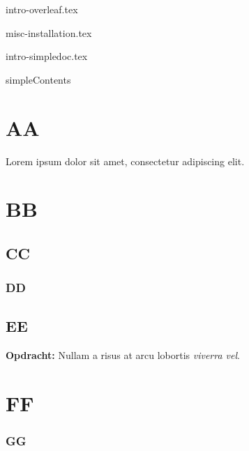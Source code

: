 \documentclass{cursuspresentatie}
\def\importslide#1#2{%
	{#2}
}
\begin{document}
    \importslide{intro}{intro-overleaf.tex}

	\importslide{misc}{misc-installation.tex}


    \importslide{intro}{intro-simpledoc.tex}


\begin{saveblock}{simpleContents}
    \begin{highlightblock}[linewidth=0.5\textwidth,gobble=8]
        \section{AA}
		Lorem ipsum dolor sit amet,
		consectetur adipiscing elit.
        
        \section{BB}
        \subsection{CC}
        \subsubsection{DD}
        \subsection{EE}
        \textbf{Opdracht:} Nullam
		a risus at arcu lobortis
		\textit{viverra vel}.
        
        \section{FF}
        \subsubsection{GG}
    \end{highlightblock}
\end{saveblock}
\end{document}
